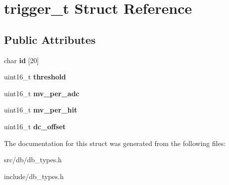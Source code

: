 \hypertarget{structtrigger__t}{
\section{trigger\_\-t Struct Reference}
\label{structtrigger__t}
}
\subsection*{Public Attributes}
\begin{DoxyCompactItemize}
\item 
\hypertarget{structtrigger__t_a1413a20949ca5405eafb2639dbd0300a}{
char {\bfseries id} \mbox{[}20\mbox{]}}
\label{structtrigger__t_a1413a20949ca5405eafb2639dbd0300a}

\item 
\hypertarget{structtrigger__t_af6786aaa2cba4e5e326545754c8931f5}{
uint16\_\-t {\bfseries threshold}}
\label{structtrigger__t_af6786aaa2cba4e5e326545754c8931f5}

\item 
\hypertarget{structtrigger__t_ac9e3ee4feeca42408fd245b565743160}{
uint16\_\-t {\bfseries mv\_\-per\_\-adc}}
\label{structtrigger__t_ac9e3ee4feeca42408fd245b565743160}

\item 
\hypertarget{structtrigger__t_a320ba0b9e590fdab65e3f99dfb3233d0}{
uint16\_\-t {\bfseries mv\_\-per\_\-hit}}
\label{structtrigger__t_a320ba0b9e590fdab65e3f99dfb3233d0}

\item 
\hypertarget{structtrigger__t_a2383182ea83764f12f5edbe1bbb5ad31}{
uint16\_\-t {\bfseries dc\_\-offset}}
\label{structtrigger__t_a2383182ea83764f12f5edbe1bbb5ad31}

\end{DoxyCompactItemize}


The documentation for this struct was generated from the following files:\begin{DoxyCompactItemize}
\item 
src/db/db\_\-types.h\item 
include/db\_\-types.h\end{DoxyCompactItemize}
